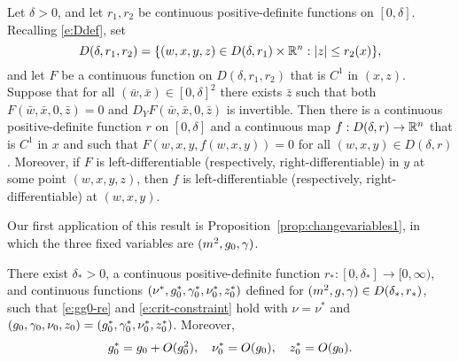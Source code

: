 \begin{prop}
\label{prop:IFT}
Let $\delta > 0$, and let $r_1, r_2$ be continuous positive-definite functions on $[0, \delta]$.
Recalling \eqref{e:Ddef}, set
\begin{equation}
D(\delta, r_1, r_2)
	=
\{ (w, x, y, z) \in D(\delta, r_1) \times {\mathbb R}^n : |z| \leq r_2(x) \},
\end{equation}
and let $F$ be a continuous function on $D(\delta, r_1, r_2)$ that is $C^1$ in $(x, z)$.
Suppose that for all $(\bar w, \bar x) \in [0, \delta]^2$ there exists $\bar z$
such that both $F(\bar w, \bar x, 0, \bar z) = 0$
and $D_Y F(\bar w, \bar x, 0, \bar z)$ is invertible.
Then there is a continuous positive-definite function $r$ on $[0, \delta]$ and
a continuous map $f : D(\delta, r) \rightarrow {\mathbb R}^n$
that is $C^1$ in $x$
and such that $F(w, x, y, f(w, x, y)) = 0$
for all $(w, x, y) \in D(\delta, r)$.
Moreover, if $F$ is left-differentiable
(respectively, right-differentiable) in $y$ at some point $(w, x, y, z)$,
then $f$ is left-differentiable (respectively, right-differentiable) at $(w, x, y)$.
\end{prop}
Our first application of this result is Proposition~\ref{prop:changevariables1},
in which the three fixed variables are $(m^2, g_0, \gamma)$.

\begin{prop}
\label{prop:changevariables1}
There exist $\delta_* > 0$,
a continuous positive-definite function $r_* : [0, \delta_*] \to [0, \infty)$,
and continuous functions $(\nu^*, g_0^*, \gamma_0^*, \nu_0^*, z_0^*)$
defined for $(m^2, g, \gamma) \in D(\delta_*, r_*)$, such that
\eqref{e:gg0-re} and \eqref{e:crit-constraint} hold with $\nu = \nu^*$ and
$(g_0, \gamma_0, \nu_0, z_0) = (g^*_0, \gamma^*_0, \nu^*_0, z^*_0)$.
Moreover,
\begin{gather}
\label{e:gznustarbd}
g_0^* = g_0 + O(g_0^2),
\quad
\nu_0^* = O(g_0),
\quad
z_0^* = O(g_0).
\end{gather}
\end{prop}

